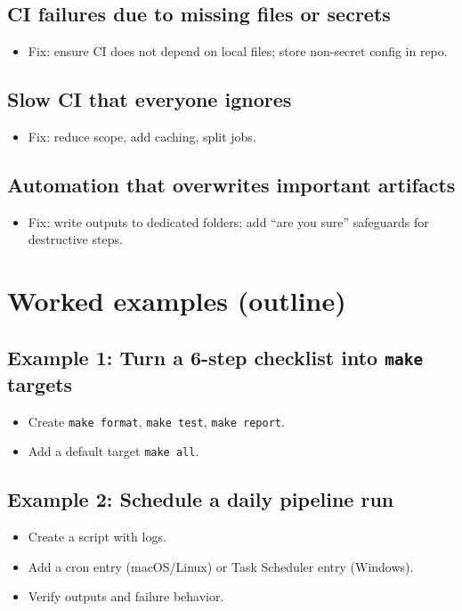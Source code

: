 \subsection{CI failures due to missing files or secrets}
\begin{itemize}
\item Fix: ensure CI does not depend on local files; store non-secret config in repo.
\end{itemize}

\subsection{Slow CI that everyone ignores}
\begin{itemize}
\item Fix: reduce scope, add caching, split jobs.
\end{itemize}

\subsection{Automation that overwrites important artifacts}
\begin{itemize}
\item Fix: write outputs to dedicated folders; add ``are you sure'' safeguards for destructive steps.
\end{itemize}

\section{Worked examples (outline)}
\subsection{Example 1: Turn a 6-step checklist into \texttt{make} targets}
\begin{itemize}
\item Create \texttt{make format}, \texttt{make test}, \texttt{make report}.
\item Add a default target \texttt{make all}.
\end{itemize}

\subsection{Example 2: Schedule a daily pipeline run}
\begin{itemize}
\item Create a script with logs.
\item Add a cron entry (macOS/Linux) or Task Scheduler entry (Windows).
\item Verify outputs and failure behavior.
\end{itemize}

